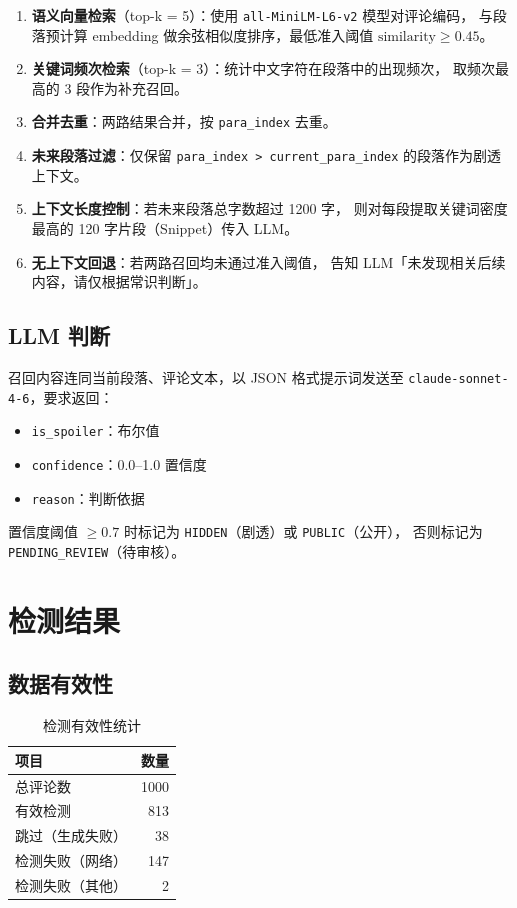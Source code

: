 \documentclass[12pt, a4paper]{article}
\begin{document}
\begin{enumerate}
  \item \textbf{语义向量检索}（top-k = 5）：使用 \texttt{all-MiniLM-L6-v2} 模型对评论编码，
        与段落预计算 embedding 做余弦相似度排序，最低准入阈值 $\text{similarity} \geq 0.45$。
  \item \textbf{关键词频次检索}（top-k = 3）：统计中文字符在段落中的出现频次，
        取频次最高的 3 段作为补充召回。
  \item \textbf{合并去重}：两路结果合并，按 \texttt{para\_index} 去重。
  \item \textbf{未来段落过滤}：仅保留 \texttt{para\_index > current\_para\_index} 的段落作为剧透上下文。
  \item \textbf{上下文长度控制}：若未来段落总字数超过 1200 字，
        则对每段提取关键词密度最高的 120 字片段（Snippet）传入 LLM。
  \item \textbf{无上下文回退}：若两路召回均未通过准入阈值，
        告知 LLM「未发现相关后续内容，请仅根据常识判断」。
\end{enumerate}

\subsection{LLM 判断}

召回内容连同当前段落、评论文本，以 JSON 格式提示词发送至
\texttt{claude-sonnet-4-6}，要求返回：

\begin{itemize}
  \item \texttt{is\_spoiler}：布尔值
  \item \texttt{confidence}：0.0--1.0 置信度
  \item \texttt{reason}：判断依据
\end{itemize}

置信度阈值 $\geq 0.7$ 时标记为 \texttt{HIDDEN}（剧透）或 \texttt{PUBLIC}（公开），
否则标记为 \texttt{PENDING\_REVIEW}（待审核）。

\section{检测结果}

\subsection{数据有效性}

\begin{table}[h]
\centering
\begin{tabular}{lr}
\toprule
\textbf{项目} & \textbf{数量} \\
\midrule
总评论数         & 1000 \\
有效检测         & 813  \\
跳过（生成失败） & 38   \\
检测失败（网络）  & 147  \\
检测失败（其他） & 2    \\
\bottomrule
\end{tabular}
\caption{检测有效性统计}
\end{table}
\end{document}

